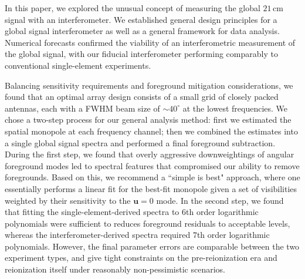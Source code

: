 \documentclass[twocolumn,apj,numberedappendix]{emulateapj}
\begin{document}
In this paper, we explored the unusual concept of measuring the global $21\,\textrm{cm}$ signal with an interferometer. We established general design principles for a global signal interferometer as well as a general framework for data analysis. Numerical forecasts confirmed the viability of an interferometric measurement of the global signal, with our fiducial interferometer performing comparably to conventional single-element experiments.

Balancing sensitivity requirements and foreground mitigation considerations, we found that an optimal array design consists of a small grid of closely packed antennas, each with a FWHM beam size of $\sim40^\circ$ at the lowest frequencies. We chose a two-step process for our general analysis method: first we estimated the spatial monopole at each frequency channel; then we combined the estimates into a single global signal spectra and performed a final foreground subtraction. During the first step, we found that overly aggressive downweightings of angular foreground modes led to spectral features that compromised our ability to remove foregrounds. Based on this, we recommend a ``simple is best" approach, where one essentially performs a linear fit for the best-fit monopole given a set of visibilities weighted by their sensitivity to the $\mathbf{u}=0$ mode. In the second step, we found that fitting the single-element-derived spectra to $6$th order logarithmic polynomials were sufficient to reduces foreground residuals to acceptable levels, whereas the interferometer-derived spectra required $7$th order logarithmic polynomials. However, the final parameter errors are comparable between the two experiment types, and give tight constraints on the pre-reionization era and reionization itself under reasonably non-pessimistic scenarios.
\end{document}
